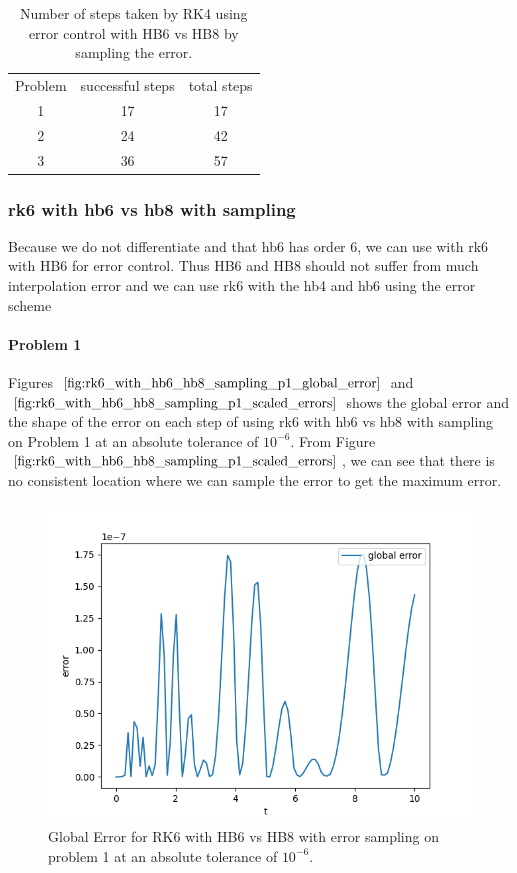 \begin{table}[h]
\caption {Number of steps taken by RK4 using error control with HB6 vs HB8 by sampling the error.} \label{tab:rk4_with_hb6_hb8_sampling_nsteps}
\begin{center}
\begin{tabular}{ c c c } 
Problem & successful steps & total steps \\ 
1       & 17                         & 17 \\ 
2       & 24                         & 42 \\
3       & 36                         & 57 \\
\end{tabular}
\end{center}
\end{table}

\subsubsection{rk6 with hb6 vs hb8 with sampling}
Because we do not differentiate and that hb6 has order 6, we can use with rk6 with HB6 for error control. Thus HB6 and HB8 should not suffer from much interpolation error and we can use rk6 with the hb4 and hb6 using the error scheme

\paragraph{Problem 1} Figures $\ref{fig:rk6_with_hb6_hb8_sampling_p1_global_error}$ and $\ref{fig:rk6_with_hb6_hb8_sampling_p1_scaled_errors}$ shows the global error and the shape of the error on each step of using rk6 with hb6 vs hb8 with sampling on Problem 1 at an absolute tolerance of $10^{-6}$. From Figure $\ref{fig:rk6_with_hb6_hb8_sampling_p1_scaled_errors}$, we can see that there is no consistent location where we can sample the error to get the maximum error.

\begin{figure}[H]
\centering
\includegraphics[width=0.7\linewidth]{./figures/rk6_with_hb6_hb8_sampling_p1_global_error}
\caption{Global Error for RK6 with HB6 vs HB8 with error sampling on problem 1 at an absolute tolerance of $10^{-6}$.}
\label{fig:rk6_with_hb6_hb8_sampling_p1_global_error}
\end{figure}

